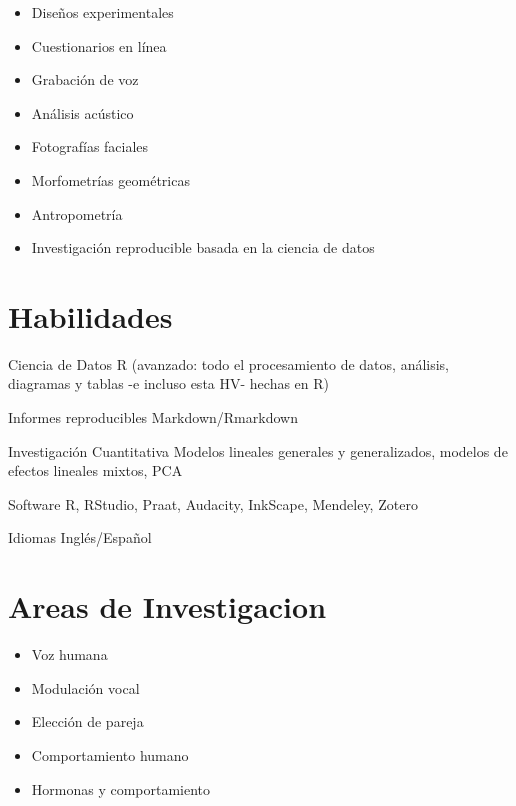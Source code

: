 \documentclass[11pt, a4paper]{awesome-cv}
\providecommand{\tightlist}{%
	\setlength{\itemsep}{0pt}\setlength{\parskip}{0pt}}
\begin{document}
\begin{itemize}
\tightlist
\item
  Diseños experimentales
\item
  Cuestionarios en línea
\item
  Grabación de voz
\item
  Análisis acústico
\item
  Fotografías faciales
\item
  Morfometrías geométricas
\item
  Antropometría
\item
  Investigación reproducible basada en la ciencia de datos
\end{itemize}

\hypertarget{habilidades}{%
\section{Habilidades}\label{habilidades}}

\begin{cvskills}
  \cvskill
    {Ciencia de Datos}
    {R (avanzado: todo el procesamiento de datos, análisis, diagramas y tablas -e incluso esta HV- hechas en R)}

  \cvskill
    {Informes reproducibles}
    {Markdown/Rmarkdown}

  \cvskill
    {Investigación Cuantitativa}
    {Modelos lineales generales y generalizados, modelos de efectos lineales mixtos, PCA}

  \cvskill
    {Software}
    {R, RStudio, Praat, Audacity, InkScape, Mendeley, Zotero}

  \cvskill
    {Idiomas}
    {Inglés/Español}
\end{cvskills}

\hypertarget{areas-de-investigacion}{%
\section{Areas de Investigacion}\label{areas-de-investigacion}}

\begin{itemize}
\tightlist
\item
  Voz humana
\item
  Modulación vocal
\item
  Elección de pareja
\item
  Comportamiento humano
\item
  Hormonas y comportamiento
\end{itemize}
\end{document}
